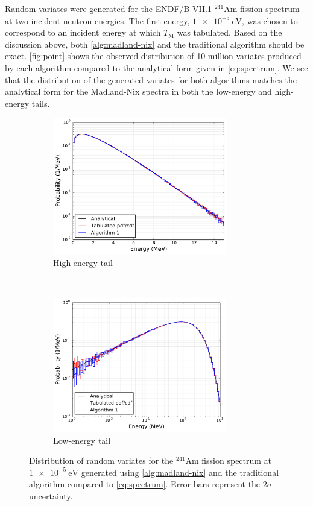 \documentclass[3p,fleqn]{elsarticle}
\newcommand{\tmax}{T_{\mathrm{M}}}
\begin{document}
Random variates were generated for the ENDF/B-VII.1 $^{241}$Am fission spectrum
at two incident neutron energies. The first energy, $\SI{1e-5}{\electronvolt}$,
was chosen to correspond to an incident energy at which $\tmax$ was
tabulated. Based on the discussion above, both \autoref{alg:madland-nix} and
the traditional algorithm should be exact.  \autoref{fig:point} shows the
observed distribution of 10 million variates produced by each algorithm
compared to the analytical form given in \autoref{eq:spectrum}. We see that the
distribution of the generated variates for both algorithms matches the
analytical form for the Madland-Nix spectra in both the low-energy and
high-energy tails.
\begin{figure}[H]
  \centering
  \begin{subfigure}[t]{0.45\textwidth}
    \includegraphics[width=3.0in]{images/spectrum-point-semilogy.pdf}
    \caption{High-energy tail}
  \end{subfigure}
  ~
  \begin{subfigure}[t]{0.45\textwidth}
    \includegraphics[width=3.0in]{images/spectrum-point-loglog.pdf}
    \caption{Low-energy tail}
  \end{subfigure}
  \caption{Distribution of random variates for the $^{241}$Am fission spectrum
    at $\SI{1e-5}{\electronvolt}$ generated using \autoref{alg:madland-nix} and
    the traditional algorithm compared to \autoref{eq:spectrum}. Error bars
    represent the $2\sigma$ uncertainty.}
  \label{fig:point}
\end{figure}
\end{document}

